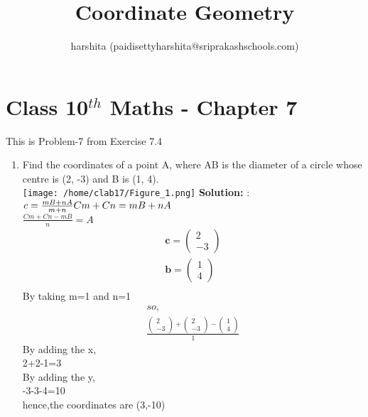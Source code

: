 \documentclass[12pt]{article}
\title{Coordinate Geometry}
\author{harshita (paidisettyharshita@sriprakashschools.com)}
\newcommand{\myvec}[1]{\ensuremath{\begin{pmatrix}#1\end{pmatrix}}}
\newcommand{\solution}{\noindent \textbf{Solution: }}
\let\vec\mathbf
\begin{document}
\maketitle
\section*{Class 10$^{th}$ Maths - Chapter 7}
This is Problem-7 from Exercise 7.4
\begin{enumerate}
\item Find the coordinates of a point A, where AB is the diameter of a circle whose centre is (2, -3) and B is (1, 4).\\
\texttt{[image: /home/clab17/Figure\_1.png]}
\solution:
$c = \frac{mB+nA}{m+n}\\
Cm+Cn=mB+nA$\\
$\frac{Cm+Cn-mB}{n}=A$\\
\begin{align}
\vec{c} = \myvec{2\\-3}\\
\vec{b} = \myvec{1\\4} \\
\end{align}
By taking m=1 and n=1
\begin{align}
so,\\
\frac{\myvec{2\\-3}+\myvec{2\\-3}-\myvec{1\\4}}{1}
\end{align}
By adding the x,\\
2+2-1=3\\
By adding the y,\\
-3-3-4=10\\
hence,the coordinates are (3,-10)

\end{enumerate}
\end{document}
